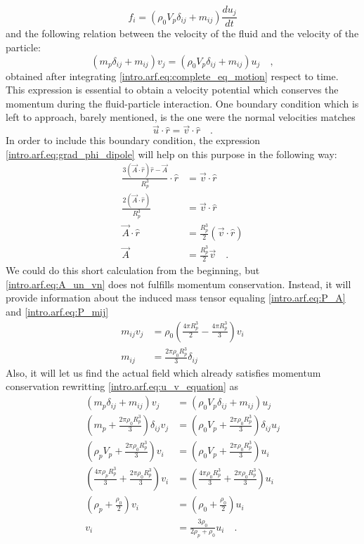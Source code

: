 \begin{equation}
    f_i = (\rho_0V_p\delta_{ij} + m_{ij})\frac{du_j}{dt}
\end{equation}
and the following relation between the velocity of the fluid and the velocity of the particle:
\begin{equation}\label{intro.arf.eq:u_v_equation}
    (m_p\delta_{ij} + m_{ij})v_j =(\rho_0V_p\delta_{ij} + m_{ij})u_j\quad,
\end{equation}
obtained after integrating \eqref{intro.arf.eq:complete_eq_motion} respect to time. This expression is essential to obtain a velocity potential which conserves the momentum during the fluid-particle interaction. One boundary condition which is left to approach, barely mentioned, is the one were the normal velocities matches
\begin{equation}\label{intro.arf.eq:vn_un}
    \vec u\cdot\hat r = \vec v\cdot \hat r\quad.
\end{equation}
In order to include this boundary condition, the expression \eqref{intro.arf.eq:grad_phi_dipole} will help on this purpose in the following way:
\begin{align}
    \frac{3(\vec A\cdot\hat r)\hat r - \vec A}{R_p^3}\cdot\hat r &= \vec v\cdot \hat r\nonumber\\
    \frac{2(\vec A\cdot\hat r)}{R_p^3} &= \vec v\cdot\hat r\nonumber\\
    \vec A\cdot\hat r &= \frac{R_p^3}{2} (\vec v\cdot\hat r) \nonumber\\
    \vec A &= \frac{R_p^3}{2} \vec v\quad.\label{intro.arf.eq:A_un_vn}
\end{align}
We could do this short calculation from the beginning, but \eqref{intro.arf.eq:A_un_vn} does not fulfills momentum conservation. Instead, it will provide information about the induced mass tensor equaling \eqref{intro.arf.eq:P_A} and \eqref{intro.arf.eq:P_mij}
\begin{align}
    m_{ij}v_j &= \rho_0\left(\frac{4\pi R_p^3}{2} - \frac{4\pi R_p^3}{3} \right)v_i\nonumber\\
    m_{ij}&= \frac{2\pi\rho_0R_p^3}{3}\delta_{ij}\label{intro.arf.eq:m_ij_A}
\end{align}
Also, it will let us find the actual field which already satisfies momentum conservation rewritting \eqref{intro.arf.eq:u_v_equation} as
\begin{align}
    (m_p\delta_{ij} + m_{ij})v_j &=(\rho_0V_p\delta_{ij} + m_{ij})u_j\nonumber\\
    \left(m_p + \frac{2\pi\rho_0R_p^3}{3}\right)\delta_{ij}v_j &=\left(\rho_0V_p + \frac{2\pi\rho_0R_p^3}{3}\right)\delta_{ij}u_j\nonumber\\
    \left(\rho_pV_p + \frac{2\pi\rho_0R_p^3}{3}\right)v_i &=\left(\rho_0V_p + \frac{2\pi\rho_0R_p^3}{3}\right)u_i\nonumber\\
    \left(\frac{4\pi\rho_pR_p^3}{3} + \frac{2\pi\rho_0R_p^3}{3}\right)v_i &=\left(\frac{4\pi\rho_0R_p^3}{3} + \frac{2\pi\rho_0R_p^3}{3}\right)u_i\nonumber\\
    \left(\rho_p + \frac{\rho_0}{2}\right)v_i &=\left(\rho_0 + \frac{\rho_0}{2}\right)u_i\nonumber\\
    v_i &=\frac{3\rho_0}{2\rho_p + \rho_0}u_i\quad.\label{intro.arf.eq:u_v_relation}
\end{align}
